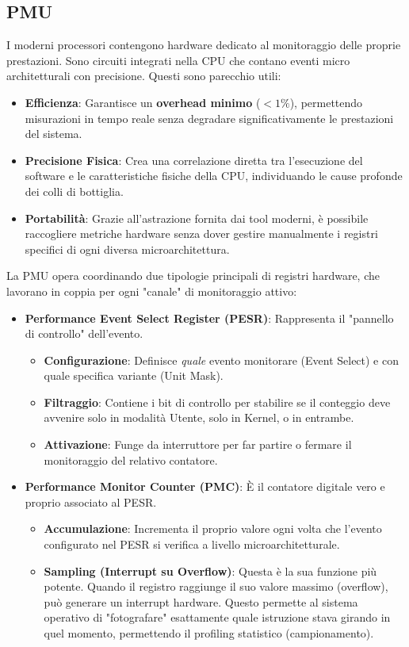 \subsection{PMU}
I moderni processori contengono hardware dedicato al monitoraggio delle proprie prestazioni. Sono circuiti integrati nella CPU che contano eventi micro architetturali con precisione.
Questi sono parecchio utili:
\begin{itemize}
    \item \textbf{Efficienza}: Garantisce un \textbf{overhead minimo} ($< 1\%$), permettendo misurazioni in tempo reale senza degradare significativamente le prestazioni del sistema.
    \item \textbf{Precisione Fisica}: Crea una correlazione diretta tra l'esecuzione del software e le caratteristiche fisiche della CPU, individuando le cause profonde dei colli di bottiglia.
    \item \textbf{Portabilità}: Grazie all'astrazione fornita dai tool moderni, è possibile raccogliere metriche hardware senza dover gestire manualmente i registri specifici di ogni diversa microarchitettura.
\end{itemize}

La PMU opera coordinando due tipologie principali di registri hardware, che lavorano in coppia per ogni "canale" di monitoraggio attivo:

\begin{itemize}
    \item \textbf{Performance Event Select Register (PESR)}: Rappresenta il "pannello di controllo" dell'evento.
    \begin{itemize}
        \item \textbf{Configurazione}: Definisce \textit{quale} evento monitorare (Event Select) e con quale specifica variante (Unit Mask).
        \item \textbf{Filtraggio}: Contiene i bit di controllo per stabilire se il conteggio deve avvenire solo in modalità Utente, solo in Kernel, o in entrambe.
        \item \textbf{Attivazione}: Funge da interruttore per far partire o fermare il monitoraggio del relativo contatore.
    \end{itemize}

    \item \textbf{Performance Monitor Counter (PMC)}: È il contatore digitale vero e proprio associato al PESR.
    \begin{itemize}
        \item \textbf{Accumulazione}: Incrementa il proprio valore ogni volta che l'evento configurato nel PESR si verifica a livello microarchitetturale.
        \item \textbf{Sampling (Interrupt su Overflow)}: Questa è la sua funzione più potente. Quando il registro raggiunge il suo valore massimo (overflow), può generare un interrupt hardware. Questo permette al sistema operativo di "fotografare" esattamente quale istruzione stava girando in quel momento, permettendo il profiling statistico (campionamento).
    \end{itemize}
\end{itemize}

